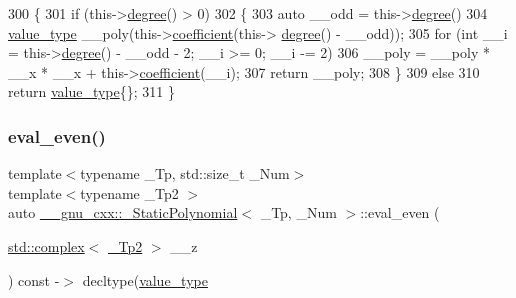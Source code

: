 \begin{DoxyCode}
300       \{
301         \textcolor{keywordflow}{if} (this->\hyperlink{class____gnu__cxx_1_1__StaticPolynomial_a56b1719601ce049e6dd768e10edfd171}{degree}() > 0)
302           \{
303             \textcolor{keyword}{auto} \_\_odd = this->\hyperlink{class____gnu__cxx_1_1__StaticPolynomial_a56b1719601ce049e6dd768e10edfd171}{degree}() %
304             \hyperlink{class____gnu__cxx_1_1__StaticPolynomial_af23110f5a002cd6caa3542df7cf35284}{value\_type} \_\_poly(this->\hyperlink{class____gnu__cxx_1_1__StaticPolynomial_a412fc570171031ff0f45db048dfda225}{coefficient}(this->
      \hyperlink{class____gnu__cxx_1_1__StaticPolynomial_a56b1719601ce049e6dd768e10edfd171}{degree}() - \_\_odd));
305             \textcolor{keywordflow}{for} (\textcolor{keywordtype}{int} \_\_i = this->\hyperlink{class____gnu__cxx_1_1__StaticPolynomial_a56b1719601ce049e6dd768e10edfd171}{degree}() - \_\_odd - 2; \_\_i >= 0; \_\_i -= 2)
306               \_\_poly = \_\_poly * \_\_x * \_\_x + this->\hyperlink{class____gnu__cxx_1_1__StaticPolynomial_a412fc570171031ff0f45db048dfda225}{coefficient}(\_\_i);
307             \textcolor{keywordflow}{return} \_\_poly;
308           \}
309         \textcolor{keywordflow}{else}
310           \textcolor{keywordflow}{return} \hyperlink{class____gnu__cxx_1_1__StaticPolynomial_af23110f5a002cd6caa3542df7cf35284}{value\_type}\{\};
311       \}
\end{DoxyCode}
\mbox{\label{class____gnu__cxx_1_1__StaticPolynomial_a2d017d79d9e93654de68c3a556c3c730}} 
\subsubsection{\texorpdfstring{eval\+\_\+even()}{eval\_even()}\hspace{0.1cm}{\footnotesize\ttfamily [2/2]}}
{\footnotesize\ttfamily template$<$typename \+\_\+\+Tp, std\+::size\+\_\+t \+\_\+\+Num$>$ \\
template$<$typename \+\_\+\+Tp2 $>$ \\
auto \hyperlink{class____gnu__cxx_1_1__StaticPolynomial}{\+\_\+\+\_\+gnu\+\_\+cxx\+::\+\_\+\+Static\+Polynomial}$<$ \+\_\+\+Tp, \+\_\+\+Num $>$\+::eval\+\_\+even (\begin{DoxyParamCaption}\item[{\hyperlink{classstd_1_1complex}{std\+::complex}$<$ \hyperlink{class____gnu__cxx_1_1__StaticPolynomial_a111ee5aedd5ae8c0b4d8fa8f29d1f9b9}{\+\_\+\+Tp2} $>$}]{\+\_\+\+\_\+z }\end{DoxyParamCaption}) const -\/$>$ decltype(\hyperlink{class____gnu__cxx_1_1__StaticPolynomial_af23110f5a002cd6caa3542df7cf35284}{value\+\_\+type}\hspace{0.3cm}{\ttfamily [inline]}}

